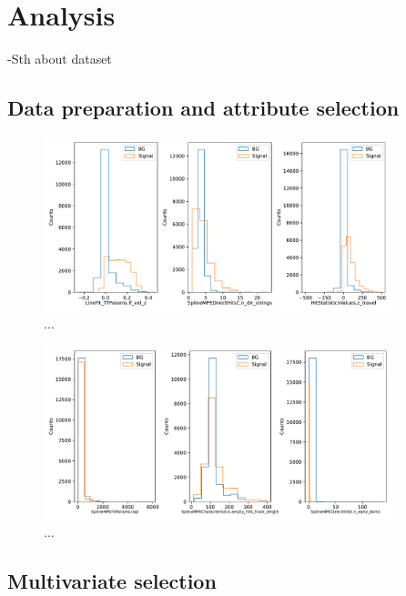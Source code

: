 \section{Analysis}
\label{sec:Analysis}

-Sth about dataset

\subsection{Data preparation and attribute selection}

\begin{figure}
    \centering
    \includegraphics[width=0.9\textwidth]{content/plots/best_3_features.pdf}
    \caption{...}
    \label{fig:best_features}
\end{figure}

\begin{figure}
    \centering
    \includegraphics[width=0.9\textwidth]{content/plots/worst_3_features.pdf}
    \caption{...}
    \label{fig:worst_features}
\end{figure}

\subsection{Multivariate selection}

